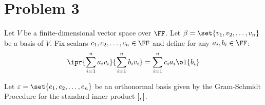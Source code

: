 \documentclass[11pt]{scrartcl}
\begin{document}
\section*{Problem 3}
Let $V$ be a finite-dimensional vector space over $\FF$. Let $\beta = \set{v_1, v_2, \dots, v_n}$ be a basis of $V$. Fix scalars $c_1, c_2, \dots, c_n \in \FF$ and define for any $a_i, b_i\in \FF$:
\begin{equation*}
\ipr{\sum_{i=1}^na_iv_i}{\sum_{i=1}^nb_iv_i} = \sum_{i=1}^nc_ia_i\ol{b_i}
\end{equation*}

Let $\varepsilon = \set{e_1, e_2,\dots, e_n}$ be an orthonormal basis given by the Gram-Schmidt Procedure for the standard inner product $[\*,\*]$.
\end{document}
